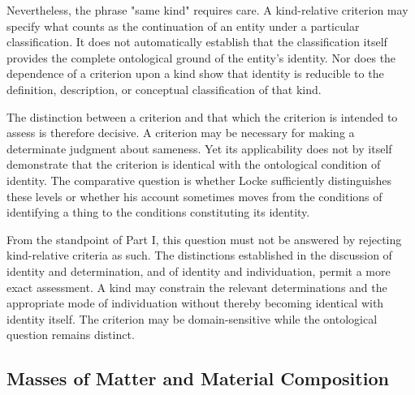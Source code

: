 \label{para:VS.B01.P01.C08.S08.SS03.P003}

Nevertheless, the phrase "same kind" requires care.
A kind-relative criterion may specify what counts as
the continuation of an entity under a particular
classification. It does not automatically establish
that the classification itself provides the complete
ontological ground of the entity's identity. Nor does
the dependence of a criterion upon a kind show that
identity is reducible to the definition, description,
or conceptual classification of that kind.

\label{para:VS.B01.P01.C08.S08.SS03.P004}

The distinction between a criterion and that which the
criterion is intended to assess is therefore decisive.
A criterion may be necessary for making a determinate
judgment about sameness. Yet its applicability does
not by itself demonstrate that the criterion is
identical with the ontological condition of identity.
The comparative question is whether Locke sufficiently
distinguishes these levels or whether his account
sometimes moves from the conditions of identifying
a thing to the conditions constituting its identity.

\label{para:VS.B01.P01.C08.S08.SS03.P005}

From the standpoint of Part I, this question must not
be answered by rejecting kind-relative criteria as
such. The distinctions established in the discussion
of identity and determination, and of identity and
individuation, permit a more exact assessment. A kind
may constrain the relevant determinations and the
appropriate mode of individuation without thereby
becoming identical with identity itself. The criterion
may be domain-sensitive while the ontological question
remains distinct. 



\subsection{Masses of Matter and Material Composition}
\label{subsec:ch08-locke-masses}


